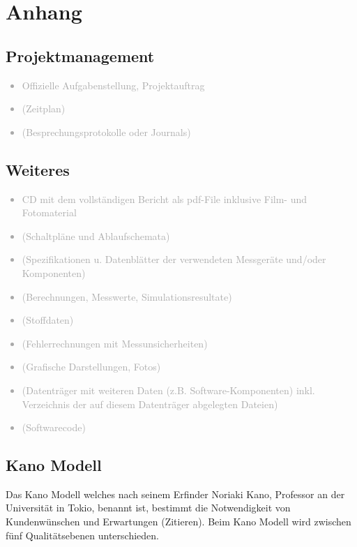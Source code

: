 
\appendix
\chapter{Anhang}
\label{sec:Anhang}

\section{Projektmanagement}\label{projektmanagement}

\textcolor{darkgray}{
  \begin{itemize}
  \item Offizielle Aufgabenstellung, Projektauftrag
  \item (Zeitplan)
  \item (Besprechungsprotokolle oder Journals)
  \end{itemize}
}

\section{Weiteres}
\label{sec:Weiteres}

\textcolor{darkgray}{
  \begin{itemize}
  \item CD mit dem vollständigen Bericht als pdf-File inklusive Film- und Fotomaterial
  \item (Schaltpläne und Ablaufschemata)
  \item (Spezifikationen u. Datenblätter der verwendeten Messgeräte und/oder Komponenten)
  \item (Berechnungen, Messwerte, Simulationsresultate)
  \item (Stoffdaten)
  \item (Fehlerrechnungen mit Messunsicherheiten)
  \item (Grafische Darstellungen, Fotos)
  \item (Datenträger mit weiteren Daten (z.B. Software-Komponenten) inkl. Verzeichnis der auf diesem Datenträger abgelegten Dateien)
  \item (Softwarecode)
  \end{itemize}
}
\newpage{}
\section{Kano Modell}
\label{sec:kanomodel}
Das Kano Modell welches nach seinem Erfinder Noriaki Kano, Professor an der Universität in Tokio, benannt ist, bestimmt die Notwendigkeit von Kundenwünschen und Erwartungen (Zitieren). Beim Kano Modell wird zwischen fünf Qualitätsebenen unterschieden.

